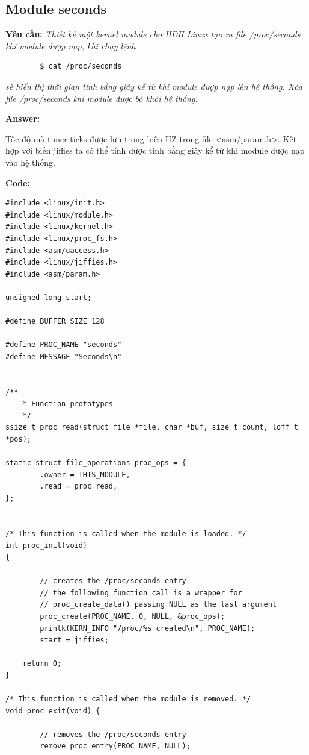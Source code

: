 \documentclass{article}
\newenvironment{answer}{
    {\bf Answer:} \sf \begingroup\color{black}
}{\endgroup}%
\begin{document}
\subsection{Module seconds}
\textbf{Yêu cầu: }\textit{Thiết kế một kernel module cho HĐH Linux tạo ra file /proc/seconds khi module đượp nạp, khi chạy lệnh}
\begin{verbatim}
        $ cat /proc/seconds
\end{verbatim}
\textit{sẽ hiển thị thời gian tính bằng giây kể từ khi module đượp nạp lên hệ thống. Xóa file /proc/seconds khi module được bỏ khỏi hệ thống.}

\begin{shaded}
    \begin{answer}
        Tốc độ mà timer ticks được lưu trong biến HZ trong file <asm/param.h>. Kết hợp với biến jiffies ta có thể tính được tính bằng giây kể từ khi module được nạp vào hệ thống.
    \end{answer}

    \textbf{Code: }
    \begin{lstlisting}
#include <linux/init.h>
#include <linux/module.h>
#include <linux/kernel.h>
#include <linux/proc_fs.h>
#include <asm/uaccess.h>
#include <linux/jiffies.h>
#include <asm/param.h>

unsigned long start;

#define BUFFER_SIZE 128

#define PROC_NAME "seconds"
#define MESSAGE "Seconds\n"


/**
    * Function prototypes
    */
ssize_t proc_read(struct file *file, char *buf, size_t count, loff_t *pos);

static struct file_operations proc_ops = {
        .owner = THIS_MODULE,
        .read = proc_read,
};


/* This function is called when the module is loaded. */
int proc_init(void)
{

        // creates the /proc/seconds entry
        // the following function call is a wrapper for
        // proc_create_data() passing NULL as the last argument
        proc_create(PROC_NAME, 0, NULL, &proc_ops);
        printk(KERN_INFO "/proc/%s created\n", PROC_NAME);
        start = jiffies;

    return 0;
}

/* This function is called when the module is removed. */
void proc_exit(void) {

        // removes the /proc/seconds entry
        remove_proc_entry(PROC_NAME, NULL);


\end{lstlisting}
\end{shaded}
\end{document}
